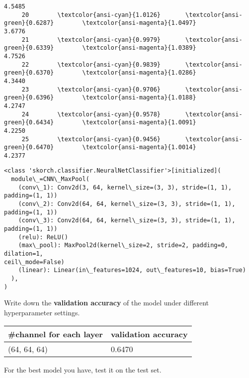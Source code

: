 \documentclass[11pt]{article}
\makeatletter
\newcommand{\boxspacing}{\kern\kvtcb@left@rule\kern\kvtcb@boxsep}
\newcommand{\prompt}[4]{
        \ttfamily\llap{{\color{#2}[#3]:\hspace{3pt}#4}}\vspace{-\baselineskip}
    }
\makeatother
\begin{document}
\begin{Verbatim}[commandchars=\\\{\}]
4.5485
     20        \textcolor{ansi-cyan}{1.0126}       \textcolor{ansi-green}{0.6287}        \textcolor{ansi-magenta}{1.0497}
3.6776
     21        \textcolor{ansi-cyan}{0.9979}       \textcolor{ansi-green}{0.6339}        \textcolor{ansi-magenta}{1.0389}
4.7526
     22        \textcolor{ansi-cyan}{0.9839}       \textcolor{ansi-green}{0.6370}        \textcolor{ansi-magenta}{1.0286}
4.3440
     23        \textcolor{ansi-cyan}{0.9706}       \textcolor{ansi-green}{0.6396}        \textcolor{ansi-magenta}{1.0188}
4.2747
     24        \textcolor{ansi-cyan}{0.9578}       \textcolor{ansi-green}{0.6434}        \textcolor{ansi-magenta}{1.0091}
4.2250
     25        \textcolor{ansi-cyan}{0.9456}       \textcolor{ansi-green}{0.6470}        \textcolor{ansi-magenta}{1.0014}
4.2377
    \end{Verbatim}

            \begin{tcolorbox}[breakable, size=fbox, boxrule=.5pt, pad at break*=1mm, opacityfill=0]
\prompt{Out}{outcolor}{12}{\boxspacing}
\begin{Verbatim}[commandchars=\\\{\}]
<class 'skorch.classifier.NeuralNetClassifier'>[initialized](
  module\_=CNN\_MaxPool(
    (conv\_1): Conv2d(3, 64, kernel\_size=(3, 3), stride=(1, 1), padding=(1, 1))
    (conv\_2): Conv2d(64, 64, kernel\_size=(3, 3), stride=(1, 1), padding=(1, 1))
    (conv\_3): Conv2d(64, 64, kernel\_size=(3, 3), stride=(1, 1), padding=(1, 1))
    (relu): ReLU()
    (max\_pool): MaxPool2d(kernel\_size=2, stride=2, padding=0, dilation=1,
ceil\_mode=False)
    (linear): Linear(in\_features=1024, out\_features=10, bias=True)
  ),
)
\end{Verbatim}
\end{tcolorbox}
        
    Write down the \textbf{validation accuracy} of the model under different
hyperparameter settings.

\begin{longtable}[]{@{}ll@{}}
\toprule
\#channel for each layer & validation accuracy\tabularnewline
\midrule
\endhead
(64, 64, 64) & 0.6470\tabularnewline
\bottomrule
\end{longtable}

    For the best model you have, test it on the test set.
\end{document}
